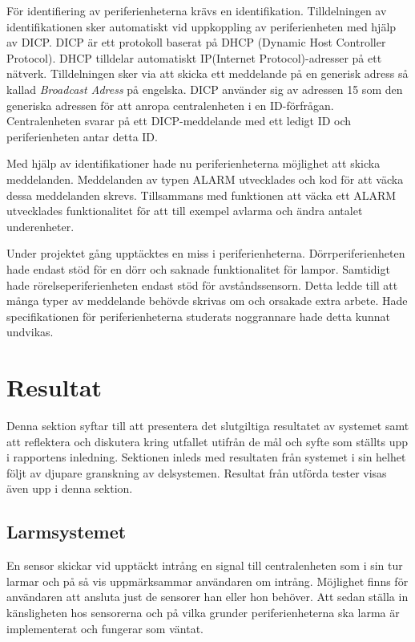 \documentclass[a4paper]{article}
\begin{document}
För identifiering av periferienheterna krävs en identifikation.
Tilldelningen av identifikationen sker automatiskt vid uppkoppling av periferienheten med hjälp av DICP.
DICP är ett protokoll baserat på DHCP (Dynamic Host Controller Protocol).
DHCP tilldelar automatiskt IP(Internet Protocol)-adresser på ett nätverk.
Tilldelningen sker via att skicka ett meddelande på en generisk adress så kallad \textit{Broadcast Adress} på engelska.
DICP använder sig av adressen 15 som den generiska adressen för att anropa centralenheten i en ID-förfrågan.
Centralenheten svarar på ett DICP-meddelande med ett ledigt ID och periferienheten antar detta ID.

Med hjälp av identifikationer hade nu periferienheterna möjlighet att skicka meddelanden.
Meddelanden av typen ALARM utvecklades och kod för att väcka dessa meddelanden skrevs.
Tillsammans med funktionen att väcka ett ALARM utvecklades funktionalitet för att till exempel avlarma och ändra antalet underenheter.

Under projektet gång upptäcktes en miss i periferienheterna.
Dörrperiferienheten hade endast stöd för en dörr och saknade funktionalitet för lampor.
Samtidigt hade rörelseperiferienheten endast stöd för avståndssensorn.
Detta ledde till att många typer av meddelande behövde skrivas om och orsakade extra arbete.
Hade specifikationen för periferienheterna studerats noggrannare hade detta kunnat undvikas.


\section{Resultat}
Denna sektion syftar till att presentera det slutgiltiga resultatet av systemet samt att reflektera och diskutera kring utfallet utifrån de mål och syfte som ställts upp i rapportens inledning.
Sektionen inleds med resultaten från systemet i sin helhet följt av djupare granskning av delsystemen.
Resultat från utförda tester visas även upp i denna sektion.

\subsection{Larmsystemet}
En sensor skickar vid upptäckt intrång en signal till centralenheten som i sin tur larmar och på så vis uppmärksammar användaren om intrång.
Möjlighet finns för användaren att ansluta just de sensorer han eller hon behöver.
Att sedan ställa in känsligheten hos sensorerna och på vilka grunder periferienheterna ska larma är implementerat och fungerar som väntat.
\end{document}
